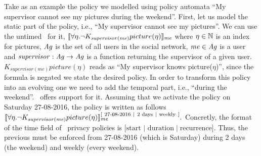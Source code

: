   \begin{example}
  Take as an example the policy we modelled using policy automata ``My supervisor cannot see my pictures during the weekend''. First, let us model the static part of the policy, i.e., ``My supervisor cannot see my pictures''. We can use the untimed \ppl~for it,
  $ \llbracket \forall \eta. \neg K_{\mathit{supervisor(me)}} picture(\eta) \rrbracket_{\mathit{me}}$
  where $\eta \in \mathbb{N}$ is an index for pictures, $\mathit{Ag}$ is the set of all users in the social network, $\mathit{me} \in \mathit{Ag}$ is a user and $\mathit{supervisor} : \mathit{Ag} \rightarrow \mathit{Ag}$ is a function returning the supervisor of a given user. $K_{\mathit{supervisor(me)}} picture(\eta)$ reads as ``My supervisor knows picture($\eta$)'', since the formula is negated we state the desired policy. In order to transform this policy into an evolving one we need to add the temporal part, i.e., ``during the weekend''. \tppl~offers support for it. Assuming that we activate the policy on Saturday 27-08-2016, the policy is written as follows
  $\llbracket \forall \eta. \neg K_{\mathit{supervisor(me)}} picture(\eta) \rrbracket_{\mathit{me}}^{[ ~ \text{27-08-2016} ~ \mid ~ \text{2 days} ~ \mid ~ \text{weekly} ~ ]}.$
  Concretly, the format of the time field of \tppl~privacy policies is $[\text{start} $ $\mid $ $\text{duration} \mid \text{recurrence} ]$. Thus, the previous must be enforced from 27-08-2016 (which is Saturday) during 2 days (the weekend) and weekly (every weekend).
    \end{example}
